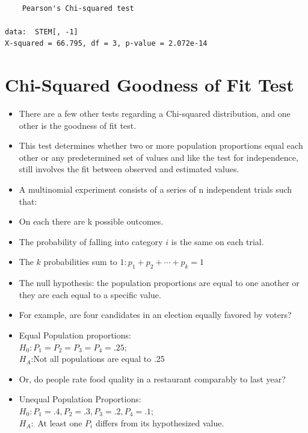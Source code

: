 \documentclass[
  letterpaper,
  DIV=11,
  numbers=noendperiod]{scrreprt}
\begin{document}
\begin{verbatim}

    Pearson's Chi-squared test

data:  STEM[, -1]
X-squared = 66.795, df = 3, p-value = 2.072e-14
\end{verbatim}


\chapter{Chi-Squared Goodness of Fit
Test}\label{chi-squared-goodness-of-fit-test}

\begin{itemize}
\item
  There are a few other tests regarding a Chi-squared distribution, and
  one other is the goodness of fit test.
\item
  This test determines whether two or more population proportions equal
  each other or any predetermined set of values and like the test for
  independence, still involves the fit between observed and estimated
  values.
\item
  A multinomial experiment consists of a series of n independent trials
  such that:
\item
  On each there are k possible outcomes.
\item
  The probability of falling into category \(i\) is the same on each
  trial.
\item
  The \(k\) probabilities sum to \(1:p_1 + p_2 +⋯+p_k = 1\)
\item
  The null hypothesis: the population proportions are equal to one
  another or they are each equal to a specific value.
\item
  For example, are four candidates in an election equally favored by
  voters?
\item
  Equal Population proportions:\\
  \(H_0: P_1=P_2=P_3=P_4=.25;\)\\
  \(H_A\):Not all populations are equal to .25
\item
  Or, do people rate food quality in a restaurant comparably to last
  year?
\item
  Unequal Population Proportions:\\
  \(H_0: P_1= .4, P_2=.3, P_3= .2, P_4=.1;\)\\
  \(H_A:\) At least one \(P_i\) differs from its hypothesized value.
\end{itemize}
\end{document}
